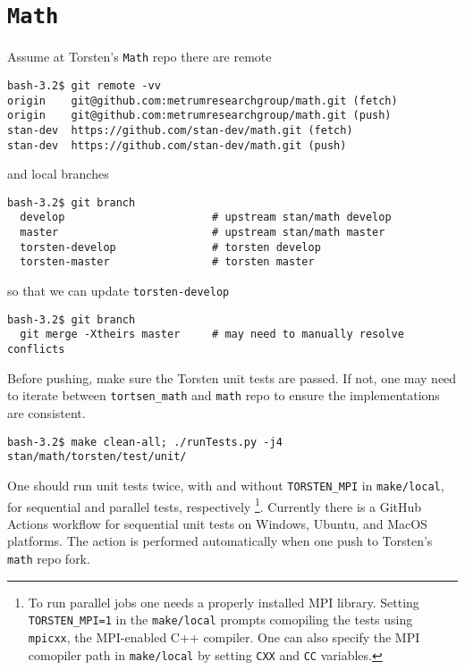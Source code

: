 \documentclass[12pt, reqno, oneside]{amsbook}
\numberwithin{equation}{chapter}
\numberwithin{figure}{chapter}
\numberwithin{table}{chapter}
\theoremstyle{remark}
\begin{document}
\section{\texttt{Math}}
\label{sec:org8bcb265}
Assume at Torsten's \texttt{Math} repo there are remote
\begin{verbatim}
bash-3.2$ git remote -vv
origin    git@github.com:metrumresearchgroup/math.git (fetch)
origin    git@github.com:metrumresearchgroup/math.git (push)
stan-dev  https://github.com/stan-dev/math.git (fetch)
stan-dev  https://github.com/stan-dev/math.git (push)
\end{verbatim}
and local branches
\begin{verbatim}
bash-3.2$ git branch
  develop                       # upstream stan/math develop
  master                        # upstream stan/math master
  torsten-develop               # torsten develop
  torsten-master                # torsten master
\end{verbatim}
so that we can update \texttt{torsten-develop}
\begin{verbatim}
bash-3.2$ git branch
  git merge -Xtheirs master     # may need to manually resolve conflicts
\end{verbatim}
Before pushing, make sure the Torsten unit tests are passed. If not,
one may need to iterate between \texttt{tortsen\_math} and \texttt{math} repo to
ensure the implementations are consistent.
\begin{verbatim}
bash-3.2$ make clean-all; ./runTests.py -j4 stan/math/torsten/test/unit/
\end{verbatim}
One should run unit tests twice, with and without \texttt{TORSTEN\_MPI} in
\texttt{make/local}, for sequential and parallel tests, respectively \footnote{To run parallel jobs one needs a properly installed MPI
library. Setting \texttt{TORSTEN\_MPI=1} in the \texttt{make/local} prompts
comopiling the tests using \texttt{mpicxx}, the MPI-enabled C++ compiler. One
can also specify the MPI comopiler path in \texttt{make/local} by setting
\texttt{CXX} and \texttt{CC} variables.}.
Currently there is a GitHub Actions workflow for sequential unit tests
on Windows, Ubuntu, and MacOS platforms. The action is performed
automatically when one push to Torsten's \texttt{math} repo fork.
\end{document}
